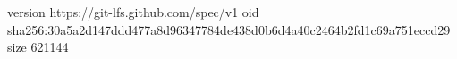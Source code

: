 version https://git-lfs.github.com/spec/v1
oid sha256:30a5a2d147ddd477a8d96347784de438d0b6d4a40c2464b2fd1c69a751eccd29
size 621144
